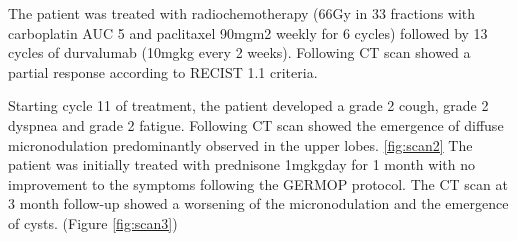 \documentclass{article}
\begin{document}
The patient was treated with radiochemotherapy (66Gy in 33 fractions with carboplatin AUC 5 and paclitaxel 90mg\/m2 weekly for 6 cycles) followed by 13 cycles of durvalumab (10mg\/kg every 2 weeks). Following CT scan showed a partial response according to RECIST 1.1 criteria.

Starting cycle 11 of treatment, the patient developed a grade 2 cough, grade 2 dyspnea and grade 2 fatigue. Following CT scan showed the emergence of diffuse micronodulation predominantly observed in the upper lobes. \ref{fig:scan2}
The patient was initially treated with prednisone 1mg\/kg\/day for 1 month with no improvement to the symptoms following the GERMOP protocol. \cite{lazor_cryptogenic_2000}
The CT scan at 3 month follow-up showed a worsening of the micronodulation and the emergence of cysts. (Figure \ref{fig:scan3})
\end{document}
